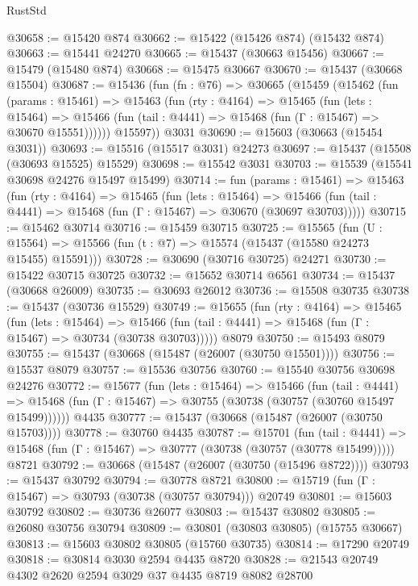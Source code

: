 \begin{lexlean}{RustStd}
\begin{coremodule}
@30658 := @15420 @874
@30662 := @15422 (@15426 @874) (@15432 @874)
@30663 := @15441 @24270
@30665 := @15437 (@30663 @15456)
@30667 := @15479 (@15480 @874)
@30668 := @15475 @30667
@30670 := @15437 (@30668 @15504)
@30687 := @15436
    (fun (fn : @76) =>
    @30665
      (@15459
        (@15462
          (fun (params : @15461) =>
          @15463
            (fun (rty : @4164) =>
            @15465
              (fun (lets : @15464) =>
              @15466 (fun (tail : @4441) => @15468 (fun (Γ : @15467) => @30670 @15551))))))
        @15597))
    @3031
@30690 := @15603 (@30663 (@15454 @3031))
@30693 := @15516 (@15517 @3031) @24273
@30697 := @15437 (@15508 (@30693 @15525) @15529)
@30698 := @15542 @3031
@30703 := @15539 (@15541 @30698 @24276 @15497 @15499)
@30714 := fun (params : @15461) =>
  @15463
    (fun (rty : @4164) =>
    @15465
      (fun (lets : @15464) =>
      @15466 (fun (tail : @4441) => @15468 (fun (Γ : @15467) => @30670 (@30697 @30703)))))
@30715 := @15462 @30714
@30716 := @15459 @30715
@30725 := @15565
    (fun (U : @15564) => @15566 (fun (t : @7) => @15574 (@15437 (@15580 @24273 @15455) @15591)))
@30728 := @30690 (@30716 @30725) @24271
@30730 := @15422 @30715 @30725
@30732 := @15652 @30714 @6561
@30734 := @15437 (@30668 @26009)
@30735 := @30693 @26012
@30736 := @15508 @30735
@30738 := @15437 (@30736 @15529)
@30749 := @15655
    (fun (rty : @4164) =>
    @15465
      (fun (lets : @15464) =>
      @15466 (fun (tail : @4441) => @15468 (fun (Γ : @15467) => @30734 (@30738 @30703)))))
    @8079
@30750 := @15493 @8079
@30755 := @15437 (@30668 (@15487 (@26007 (@30750 @15501))))
@30756 := @15537 @8079
@30757 := @15536 @30756
@30760 := @15540 @30756 @30698 @24276
@30772 := @15677
    (fun (lets : @15464) =>
    @15466
      (fun (tail : @4441) =>
      @15468 (fun (Γ : @15467) => @30755 (@30738 (@30757 (@30760 @15497 @15499))))))
    @4435
@30777 := @15437 (@30668 (@15487 (@26007 (@30750 @15703))))
@30778 := @30760 @4435
@30787 := @15701
    (fun (tail : @4441) => @15468 (fun (Γ : @15467) => @30777 (@30738 (@30757 (@30778 @15499)))))
    @8721
@30792 := @30668 (@15487 (@26007 (@30750 (@15496 @8722))))
@30793 := @15437 @30792
@30794 := @30778 @8721
@30800 := @15719 (fun (Γ : @15467) => @30793 (@30738 (@30757 @30794))) @20749
@30801 := @15603 @30792
@30802 := @30736 @26077
@30803 := @15437 @30802
@30805 := @26080 @30756 @30794
@30809 := @30801 (@30803 @30805) (@15755 @30667)
@30813 := @15603 @30802 @30805 (@15760 @30735)
@30814 := @17290 @20749
@30818 := @30814 @3030 @2594 @4435 @8720
@30828 := @21543 @20749 @4302 @2620 @2594 @3029 @37 @4435 @8719 @8082 @28700

\end{coremodule}
\end{lexlean}
